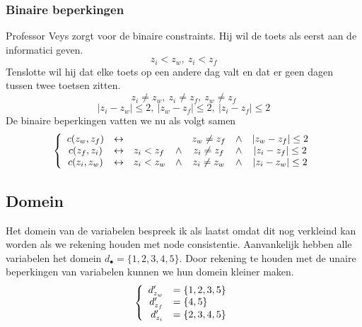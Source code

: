 \documentclass[alternative-exam.tex]{subfiles}
\begin{document}
\subsubsection{Binaire beperkingen}
Professor Veys zorgt voor de binaire constraints. Hij wil de toets als eerst aan de informatici geven.
\[
z_i < z_w,\ z_i < z_f
\]
Tenslotte wil hij dat elke toets op een andere dag valt en dat er geen dagen tussen twee toetsen zitten.
\[
z_i \neq z_w,\ z_i \neq z_f,\ z_w \neq z_f
\]
\[
|z_i - z_w| \le 2,\ |z_w - z_f| \le 2,\ |z_i - z_f| \le 2
\]
De binaire beperkingen vatten we nu als volgt samen
\[
\left\lbrace
\begin{array}{c l l c c c c}
c(z_w, z_f) & \leftrightarrow && & z_w \neq z_f &\wedge& |z_w - z_f| \le 2\\
c(z_f, z_i) & \leftrightarrow & z_i < z_f &\wedge& z_i \neq z_f &\wedge& |z_i - z_f| \le 2\\
c(z_i, z_w) & \leftrightarrow & z_i < z_w &\wedge& z_i \neq z_w &\wedge& |z_i - z_w| \le 2\\
\end{array}
\right.
\]

\subsection{Domein}
Het domein van de variabelen bespreek ik als laatst omdat dit nog verkleind kan worden als we rekening houden met node consistentie.
Aanvankelijk hebben alle variabelen het domein $d_\bullet = \{1,2,3,4,5\}$. Door rekening te houden met de unaire beperkingen van variabelen kunnen we hun domein kleiner maken.
\[
\left\lbrace
\begin{array}{r l}
d_{z_w}' &= \{1,2,3,5\}\\
d_{z_f}' &= \{4,5\}\\
d_{z_i}' &= \{2,3,4,5\}\\
\end{array}
\right.
\]
\end{document}
